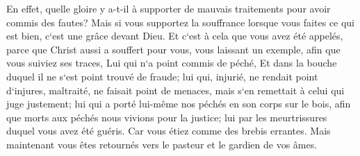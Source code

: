 \verse En effet, quelle gloire y a-t-il à supporter de mauvais traitements pour avoir commis des fautes? Mais si vous supportez la souffrance lorsque vous faites ce qui est bien, c`est une grâce devant Dieu. 
\verse Et c`est à cela que vous avez été appelés, parce que Christ aussi a souffert pour vous, vous laissant un exemple, afin que vous suiviez ses traces, 
\verse Lui qui n`a point commis de péché, Et dans la bouche duquel il ne s`est point trouvé de fraude; 
\verse lui qui, injurié, ne rendait point d`injures, maltraité, ne faisait point de menaces, mais s`en remettait à celui qui juge justement; 
\verse lui qui a porté lui-même nos péchés en son corps sur le bois, afin que morts aux péchés nous vivions pour la justice; lui par les meurtrissures duquel vous avez été guéris. 
\verse Car vous étiez comme des brebis errantes. Mais maintenant vous êtes retournés vers le pasteur et le gardien de vos âmes. 

\chapter{}

